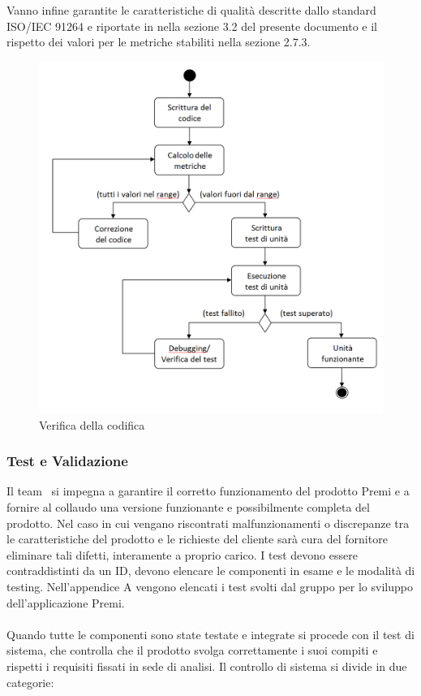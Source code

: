Vanno infine garantite le caratteristiche di qualità descritte dallo standard ISO/IEC 91264 e riportate in nella sezione 3.2 del presente documento e il rispetto dei valori per le metriche stabiliti nella sezione 2.7.3.

\begin{figure}[h!]
	\centering
	\includegraphics[scale=.5]{img/schema_Test.png}
	\caption{Verifica della codifica}
\end{figure}

\subsubsection{Test e Validazione}
Il team \gruppo\ si impegna a garantire il corretto funzionamento del prodotto Premi e a fornire al collaudo una versione funzionante e possibilmente completa del prodotto. Nel caso in cui vengano riscontrati malfunzionamenti o discrepanze tra le caratteristiche del prodotto e le richieste del cliente sarà cura del fornitore eliminare tali difetti, interamente a proprio carico. I test devono essere contraddistinti da un ID, devono elencare le componenti in esame e le modalità di testing. Nell'appendice A vengono elencati i test svolti dal gruppo per lo sviluppo dell'applicazione Premi.\\ \\
Quando tutte le componenti sono state testate e integrate si procede con il test di sistema, che controlla che il prodotto svolga correttamente i suoi compiti e rispetti i requisiti fissati in sede di analisi. Il controllo di sistema si divide in due categorie:

